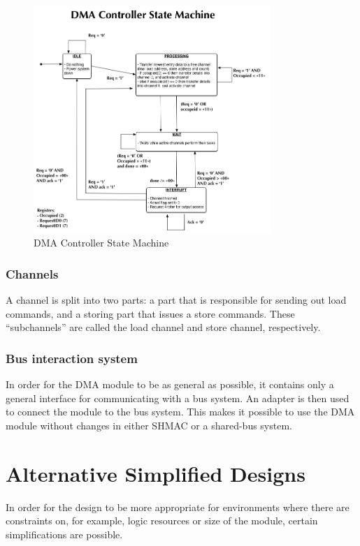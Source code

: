 \begin{figure}[htb]
    \centering
    \includegraphics[width=0.8\textwidth]{Figures/DMA/StateMachineFinal}
    \caption{DMA Controller State Machine}
    \label{fig:DMAControllerStateMachine}
\end{figure}

\subsubsection{Channels}
A channel is split into two parts: a part that is responsible for sending out load
commands, and a storing part that issues a store commands. These ``subchannels''
are called the load channel and store channel, respectively.

\subsubsection{Bus interaction system}
In order for the DMA module to be as general as possible, it contains only a general
interface for communicating with a bus system. An adapter is then used to connect
the module to the bus system. This makes it possible to use the DMA module without
changes in either SHMAC or a shared-bus system.

\section{Alternative Simplified Designs} 

In order for the design to be more appropriate for environments where there are
constraints on, for example, logic resources or size of the module, certain simplifications
are possible.

